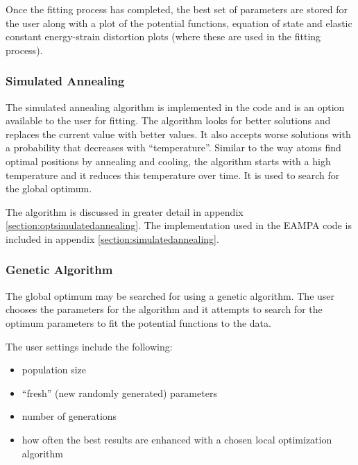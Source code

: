 Once the fitting process has completed, the best set of parameters are stored for the user along with a plot of the potential functions, equation of state and elastic constant energy-strain distortion plots (where these are used in the fitting process).




\subsubsection{Simulated Annealing}

The simulated annealing algorithm is implemented in the code and is an option available to the user for fitting.  The algorithm looks for better solutions and replaces the current value with better values.  It also accepts worse solutions with a probability that decreases with \enquote{temperature}.  Similar to the way atoms find optimal positions by annealing and cooling, the algorithm starts with a high temperature and it reduces this temperature over time.  It is used to search for the global optimum.

The algorithm is discussed in greater detail in appendix \ref{section:optsimulatedannealing}.  The implementation used in the EAMPA code is included in appendix \ref{section:simulatedannealing}.





\subsubsection{Genetic Algorithm}

The global optimum may be searched for using a genetic algorithm.  The user chooses the parameters for the algorithm and it attempts to search for the optimum parameters to fit the potential functions to the data.

The user settings include the following:

\begin{itemize}
\item population size
\item \enquote{fresh} (new randomly generated) parameters
\item number of generations
\item how often the best results are enhanced with a chosen local optimization algorithm
\end{itemize}

